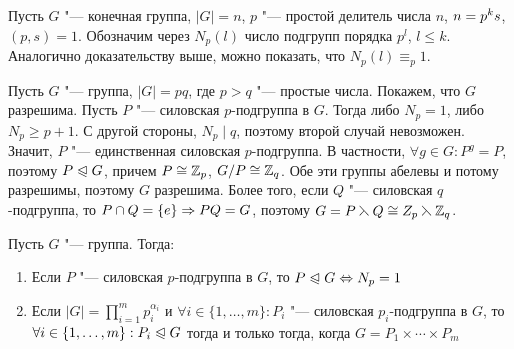 \begin{note}
	Пусть $G$ "--- конечная группа, $|G| = n$, $p$ "--- простой делитель числа $n$, $n \hm= p^ks$, $(p, s) = 1$. Обозначим через $N_p(l)$ число подгрупп порядка $p^l$, $l \le k$. Аналогично доказательству выше, можно показать, что $N_p(l) \equiv_p 1$.
\end{note}

\begin{example}
	Пусть $G$ "--- группа, $|G| = pq$, где $p > q$ "--- простые числа. Покажем, что $G$ разрешима. Пусть $P$ "--- силовская $p$-подгруппа в $G$. Тогда либо $N_p = 1$, либо $N_p \ge p + 1$. С другой стороны, $N_p\mid q$, поэтому второй случай невозможен. Значит, $P$ "--- единственная силовская $p$-подгруппа. В частности, $\forall g \in G: P^g = P$, поэтому $P \trianglelefteqslant G$, причем $P \cong \mathbb{Z}_p$, $G / P \cong \mathbb{Z}_q$. Обе эти группы абелевы и потому разрешимы, поэтому $G$ разрешима. Более того, если $Q$ "--- силовская $q$-подгруппа, то $P \cap Q = \{e\} \Rightarrow PQ = G$, поэтому $G = P \leftthreetimes Q \cong Z_p \leftthreetimes \mathbb{Z}_q$.
\end{example}

\begin{theorem} Пусть $G$ "--- группа. Тогда:
	\begin{enumerate}
		\item Если $P$ "--- силовская $p$-подгруппа в $G$, то $P \normal G \hm\lra N_p = 1$
		\item Если $|G| = \prod_{i = 1}^mp_i^{\alpha_i}$ и $\forall i \in \{1, \dotsc, m\}: P_i$ "--- силовская $p_i$-подгруппа в $G$, то $\forall i \hm\in \{1, \dotsc, m\}: P_i \normal G$ тогда и только тогда, когда $G = P_1 \times \dotsb \times P_m$
	\end{enumerate}
\end{theorem}

